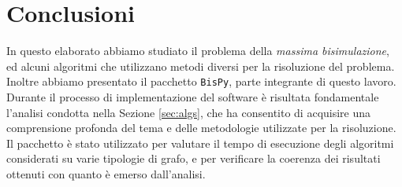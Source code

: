 \section*{Conclusioni}
\label{sec:conclusions}

In questo elaborato abbiamo studiato il problema della \emph{massima bisimulazione}, ed alcuni algoritmi che utilizzano metodi diversi per la risoluzione del problema. Inoltre abbiamo presentato il pacchetto \texttt{BisPy}, parte integrante di questo lavoro. Durante il processo di implementazione del software è risultata fondamentale l'analisi condotta nella Sezione \ref{sec:algs}, che ha consentito di acquisire una comprensione profonda del tema e delle metodologie utilizzate per la risoluzione. Il pacchetto è stato utilizzato per valutare il tempo di esecuzione degli algoritmi considerati su varie tipologie di grafo, e per verificare la coerenza dei risultati ottenuti con quanto è emerso dall'analisi.

